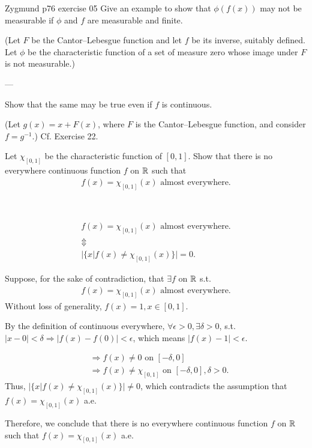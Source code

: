 \documentclass[UTF8,a4paper,10pt]{article}
\begin{document}
  \begin{Problem}[]{Zygmund p76 exercise 05}
    Give an example to show that \(\phi(f(x))\) may not be measurable if \(\phi\) and \(f\) are measurable and finite.
  
    (Let \(F\) be the Cantor–Lebesgue function and let \(f\) be its inverse, suitably defined. Let \(\phi\) be the characteristic function of a set of measure zero whose image under \(F\) is not measurable.) 
    
    ---
    
    Show that the same may be true even if \(f\) is continuous. 
    
    (Let \(g(x) = x + F(x)\), where \(F\) is the Cantor–Lebesgue function, and consider \(f = g^{-1}\).) Cf. Exercise 22.
  

  \end{Problem}

 
\begin{Problem}[]{}

  Let \(\chi_{[0,1]} \) be the characteristic function of \([0,1]\). Show that there is no everywhere continuous function \(f\) on \(\operatorname{\mathbb{R}}\) such that
\begin{equation*}
  \begin{aligned}
    f(x) = \chi_{[0,1]} (x) \,\,\text{almost everywhere.}
  \end{aligned}
\end{equation*}
\end{Problem}

\begin{solution}\,

  \begin{gather*}
    f(x) = \chi_{[0,1]}(x) \text{ almost everywhere.} \\
    \Updownarrow \\
    |\{x | f(x) \neq \chi_{[0,1]}(x)\}| = 0.
  \end{gather*}

\dotfill

  Suppose, for the sake of contradiction, that \(\exists f\) on \(\operatorname{\mathbb{R}}\) s.t. 
  \begin{gather*}
    f(x) = \chi_{[0,1]}(x) \text{ almost everywhere.}
  \end{gather*}
  Without loss of generality, \(f(x) = 1, x\in [0,1]\).

  By the definition of continuous everywhere,
  \(\forall \epsilon>0, \exists \delta>0\), s.t. \(|x-0|<\delta \Rightarrow |f(x)-f(0)|<\epsilon\), which means \(|f(x)-1|<\epsilon\).

  \begin{align*}
    &\Rightarrow f(x) \neq 0 \text{ on } [-\delta, 0] \\
    &\Rightarrow f(x) \neq \chi_{[0,1]} \text{ on } [-\delta, 0], \delta>0.
\end{align*}
Thus, \(|\{x | f(x) \neq \chi_{[0,1]}(x)\}| \neq 0\), which contradicts the assumption that \(f(x) = \chi_{[0,1]}(x) \) a.e.

Therefore, we conclude that there is no everywhere continuous function \(f\) on \(\operatorname{\mathbb{R}}\) such that \(f(x) = \chi_{[0,1]}(x) \) a.e.

\end{solution}
\end{document}
